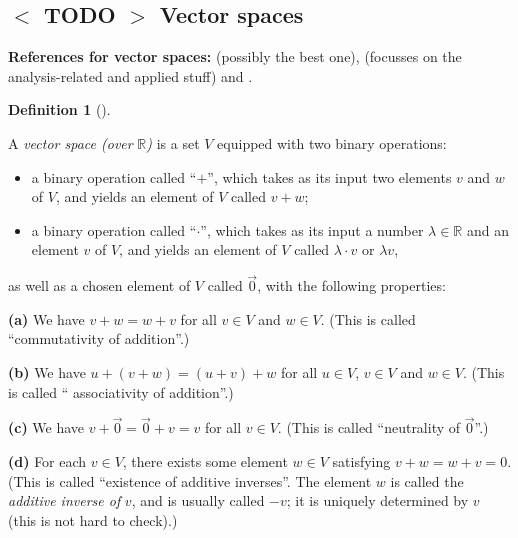 \documentclass[numbers=enddot,12pt,final,onecolumn,notitlepage]{scrartcl}%
\theoremstyle{definition}
\newtheorem{defi}[theo]{Definition}
\newenvironment{definition}[1][]
{\begin{defi}[#1]\begin{leftbar}}
{\end{leftbar}\end{defi}}
\begin{document}
\subsection{%
$<$%
TODO%
$>$
Vector spaces}

\textbf{References for vector spaces:} \cite[\S 4.1-\S 4.2]{LaNaSc16}
(possibly the best one), \cite[\S 2.1]{OlvSha06} (focusses on the
analysis-related and applied stuff) and \cite[Two.I.1]{Heffer16}.

\begin{definition}
\label{def.vectspace}A \textit{vector space (over }$\mathbb{R}$\textit{)} is a
set $V$ equipped with two binary operations:

\begin{itemize}
\item a binary operation called \textquotedblleft$+$\textquotedblright, which
takes as its input two elements $v$ and $w$ of $V$, and yields an element of
$V$ called $v+w$;

\item a binary operation called \textquotedblleft$\cdot$\textquotedblright,
which takes as its input a number $\lambda\in\mathbb{R}$ and an element $v$ of
$V$, and yields an element of $V$ called $\lambda\cdot v$ or $\lambda v$,
\end{itemize}

as well as a chosen element of $V$ called $\overrightarrow{0}$, with the
following properties:

\textbf{(a)} We have $v+w=w+v$ for all $v\in V$ and $w\in V$. (This is called
\textquotedblleft commutativity of addition\textquotedblright.)

\textbf{(b)} We have $u+\left(  v+w\right)  =\left(  u+v\right)  +w$ for all
$u\in V$, $v\in V$ and $w\in V$. (This is called \textquotedblleft
associativity of addition\textquotedblright.)

\textbf{(c)} We have $v+\overrightarrow{0}=\overrightarrow{0}+v=v$ for all
$v\in V$. (This is called \textquotedblleft neutrality of $\overrightarrow{0}%
$\textquotedblright.)

\textbf{(d)} For each $v\in V$, there exists some element $w\in V$ satisfying
$v+w=w+v=0$. (This is called \textquotedblleft existence of additive
inverses\textquotedblright. The element $w$ is called the \textit{additive
inverse of }$v$, and is usually called $-v$; it is uniquely determined by $v$
(this is not hard to check).)


\end{definition}
\end{document}
